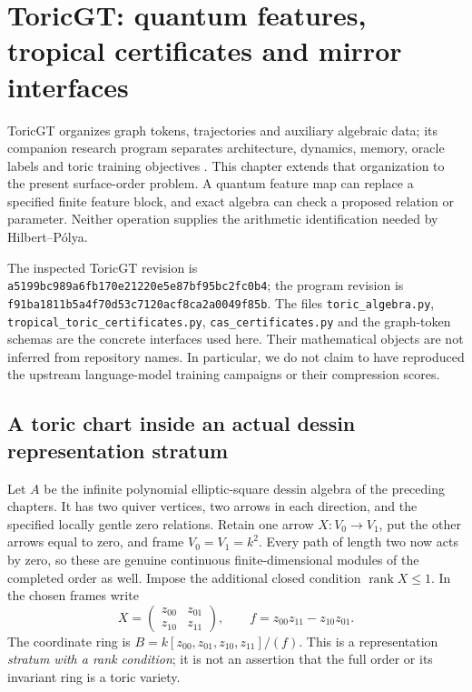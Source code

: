 \documentclass[11pt,oneside,openany]{book}
\theoremstyle{definition}\newtheorem{definition}[theorem]{Definition}
\theoremstyle{remark}\newtheorem{remark}[theorem]{Remark}
\begin{document}
\chapter[ToricGT and mirror interfaces]{ToricGT: quantum features, tropical certificates and mirror interfaces}
\label{tg:chapter}

ToricGT organizes graph tokens, trajectories and auxiliary algebraic data; its
companion research program separates architecture, dynamics, memory, oracle
labels and toric training objectives \cite{TGTCode,TGTProgram}. This chapter
extends that organization to the present surface-order problem. A quantum
feature map can replace a specified finite feature block, and exact algebra
can check a proposed relation or parameter. Neither operation supplies the
arithmetic identification needed by Hilbert--P\'olya.

The inspected ToricGT revision is
\texttt{a5199bc989a6fb170e21220e5e87bf95bc2fc0b4}; the program revision is
\texttt{f91ba1811b5a4f70d53c7120acf8ca2a0049f85b}.
The files \texttt{toric\_algebra.py},
\texttt{tropical\_toric\_certificates.py},
\texttt{cas\_certificates.py} and the graph-token schemas are the concrete
interfaces used here. Their mathematical objects are not inferred from
repository names. In particular, we do not claim to have reproduced the
upstream language-model training campaigns or their compression scores.

\section{A toric chart inside an actual dessin representation stratum}
Let $A$ be the infinite polynomial elliptic-square dessin algebra of the
preceding chapters. It has two quiver vertices, two arrows in each direction,
and the specified locally gentle zero relations. Retain one arrow
$X:V_0\to V_1$, put the other arrows equal to zero, and frame
$V_0=V_1=k^2$. Every path of length two now acts by zero, so these are genuine
continuous finite-dimensional modules of the completed order as well.
Impose the additional closed condition $\operatorname{rank}X\leq1$.
In the chosen frames write
\[
 X=\begin{pmatrix}z_{00}&z_{01}\\z_{10}&z_{11}\end{pmatrix},\qquad
 f=z_{00}z_{11}-z_{10}z_{01}.
\]
The coordinate ring is $B=k[z_{00},z_{01},z_{10},z_{11}]/(f)$.
This is a representation \emph{stratum with a rank condition}; it is not an
assertion that the full order or its invariant ring is a toric variety.
\end{document}
